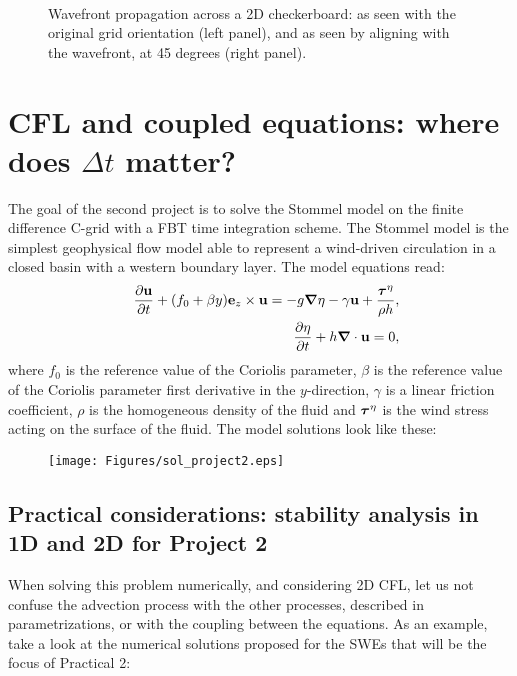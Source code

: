 	\begin{figure}[h!]
	\mbox{
	            }
			\caption{Wavefront propagation across a 2D checkerboard: as seen with the original grid orientation (left panel), and as seen by aligning with the wavefront, at 45 degrees (right panel).}
	\end{figure}
	

\section{CFL and coupled equations: where does $\Delta t$ matter?}

The goal of the second project is to solve the Stommel model on the finite difference C-grid with a FBT time integration scheme. The Stommel model is the simplest geophysical flow model able to represent a wind-driven circulation in a closed basin with a western boundary layer. The model equations read:
\begin{eqnarray}
	&&\frac{\partial \mathbf{u}}{\partial t} + (f_0+\beta y) \mathbf{e}_z \times
	\mathbf{u} = -g \mbox{\boldmath $\nabla$} \eta - \gamma \mathbf{u} + \frac{\mbox{\boldmath $\tau$}^{\eta}}{\rho h},\\
	&&\frac{\partial \eta}{\partial t} + h \mbox{\boldmath $\nabla$} \cdot \mathbf{u} = 0,
\end{eqnarray}
where $f_0$ is the reference value of the Coriolis parameter, $\beta$ is the reference value of the Coriolis parameter first derivative in the $y$-direction, $\gamma$ is a linear friction coefficient, $\rho$ is the homogeneous density of the fluid and $\mbox{\boldmath $\tau$}^{\eta}$ is the wind stress acting on the surface of the fluid. The model solutions look like these:

\begin{figure}[h!]
	\begin{center}
		\texttt{[image: Figures/sol\_project2.eps]}
	\end{center}
\end{figure}


\subsection{Practical considerations: stability analysis in 1D and 2D for Project 2}

When solving this problem numerically, and considering 2D CFL, let us not confuse the advection process with the other processes, described in parametrizations, or with the coupling between the equations. 
As an example, take a look at the numerical solutions proposed for the SWEs that will be the focus of Practical 2:

